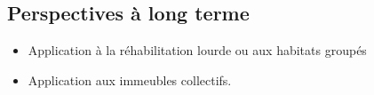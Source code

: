 \documentclass[xcolor=x11names, compress, 11pt]{beamer}
\begin{document}
\subsection{Perspectives à long terme}
\begin{frame}[c]
    \vfill
    \begin{itemize}
        \item Application à la réhabilitation lourde ou aux habitats groupés
    \vfill
        \item Application aux immeubles collectifs.
    \end{itemize}
    \vfill
\end{frame}












\end{document}
